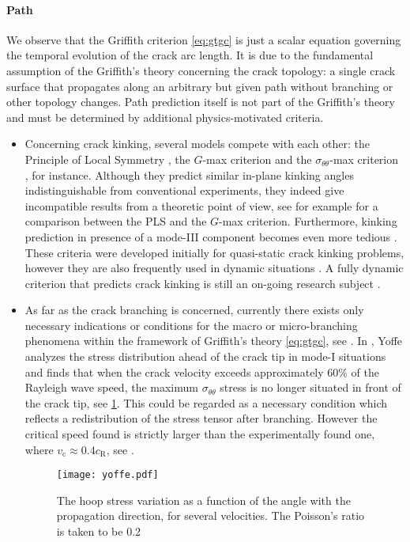 \paragraph{Path} We observe that the Griffith criterion \eqref{eq:gtgc} is just a scalar equation governing the temporal evolution of the crack arc length. It is due to the fundamental assumption of the Griffith's theory concerning the crack topology: a single crack surface that propagates along an arbitrary but given path without branching or other topology changes. Path prediction itself is not part of the Griffith's theory and must be determined by additional physics-motivated criteria.
\begin{itemize}
\item Concerning crack kinking, several models compete with each other: the Principle of Local Symmetry \cite{GolDstein:1974aa}, the $G$-max criterion \cite{Hussain:1974aa} and the $\sigma_{\theta\theta}$-max criterion \cite{Erdogan:1963aa}, for instance. Although they predict similar in-plane kinking angles indistinguishable from conventional experiments, they indeed give incompatible results from a theoretic point of view, see for example \cite{ChambolleFrancfortMarigo:2009} for a comparison between the PLS and the $G$-max criterion. Furthermore, kinking prediction in presence of a mode-III component becomes even more tedious \cite{Pham:2016aa}. These criteria were developed initially for quasi-static crack kinking problems, however they are also frequently used in dynamic situations \cite{GregoireMaigreRethoreCombescure:2007,HaboussaGregoireElguedjMaigreCombescure:2011}. A fully dynamic criterion that predicts crack kinking is still an on-going research subject \cite{Adda-Bedia:2003aa}.

\item As far as the crack branching is concerned, currently there exists only necessary indications or conditions for the macro or micro-branching phenomena within the framework of Griffith's theory \eqref{eq:gtgc}, see \cite{Ravi-ChandarKnauss:1984a,KatzavAdda-BediaArias:2007}. In \cite{Yoffe:1951}, Yoffe analyzes the stress distribution ahead of the crack tip in mode-I situations and finds that when the crack velocity exceeds approximately 60\% of the Rayleigh wave speed, the maximum $\sigma_{\theta\theta}$ stress is no longer situated in front of the crack tip, see \cref{fig:yoffe}. This could be regarded as a necessary condition which reflects a redistribution of the stress tensor after branching. However the critical speed found is strictly larger than the experimentally found one, where $v_\mathrm{c}\approx 0.4c_\mathrm{R}$, see \cite{FinebergMarder:1999}.
\begin{figure}[htbp]
\centering
\texttt{[image: yoffe.pdf]}
\caption{The hoop stress variation as a function of the angle with the propagation direction, for several velocities. The Poisson's ratio is taken to be 0.2} \label{fig:yoffe}
\end{figure}


\end{itemize}
